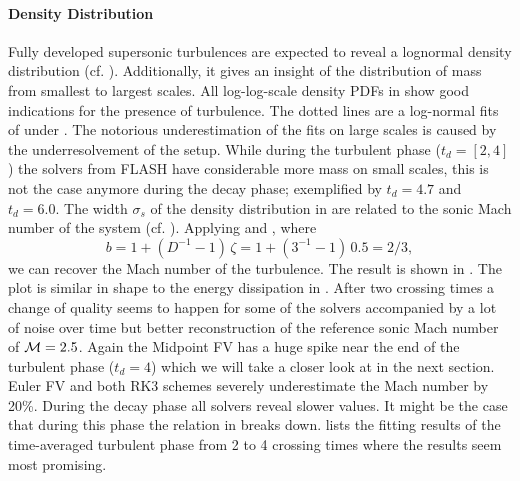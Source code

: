 \paragraph{Density Distribution}
Fully developed supersonic turbulences are expected to reveal a lognormal
density distribution (cf. ). Additionally, it gives
an insight of the distribution of mass from smallest to largest scales.
All log-log-scale density PDFs in 
show good indications for the presence of turbulence. The dotted lines are a
log-normal fits of  under . The notorious
underestimation of the fits on large scales is caused by the underresolvement
of the setup. While during the turbulent phase
($t_d = [2,4]$) the solvers from FLASH have considerable more mass on small
scales, this is not the case anymore during the decay phase; exemplified by
$t_d = 4.7$ and $t_d = 6.0$.
The width $\sigma_s$ of the density distribution in
 are related to the sonic Mach
number of the system (cf. ). Applying
 and , where
\begin{equation}
b = 1 + (D^{-1} - 1) \, \zeta = 1 + (3^{-1} - 1) \, 0.5 = 2/3,
\end{equation}
we can recover the Mach number of the turbulence. The result is shown in
. The plot is similar in shape to
the energy dissipation in .
After two crossing times a change of quality seems to happen for some of the
solvers accompanied by a lot of noise over time but better reconstruction of
the reference sonic Mach number of $\mathcal{M} = 2.5$. Again the Midpoint FV has a huge
spike near the end of the turbulent  phase ($t_d = 4$) which we will take a closer
look at in the next section. Euler FV and both RK3 schemes severely
underestimate the Mach number by 20\%. During the decay phase all solvers
reveal slower values. It might be the case that during this phase the relation
in  breaks down.  lists the fitting results
of the time-averaged turbulent phase from 2 to 4 crossing times where the results
seem most promising.

